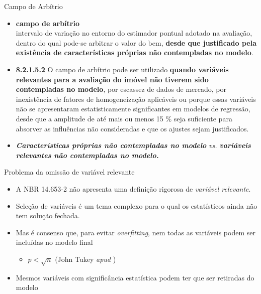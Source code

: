 \documentclass[9pt,ignorenonframetext,aspectratio=169]{beamer}
\providecommand{\tightlist}{%
  \setlength{\itemsep}{0pt}\setlength{\parskip}{0pt}}
\begin{document}
\begin{frame}{Campo de Arbítrio}
\protect\hypertarget{campo-de-arbuxedtrio}{}

\begin{itemize}[<+->]
\tightlist
\item
  \textbf{campo de arbítrio}\\
  intervalo de variação no entorno do estimador pontual adotado na
  avaliação, dentro do qual pode-se arbitrar o valor do bem,
  \textbf{desde que justificado 
  pela existência de características próprias não contempladas no modelo}.
  \autocite[3, grifo nosso]{NBR1465301}
\end{itemize}

\begin{itemize}[<+->]
\tightlist
\item
  \textbf{8.2.1.5.2} O campo de arbítrio pode ser utilizado
  \textbf{quando variáveis 
  relevantes para a avaliação do imóvel não tiverem sido contempladas no modelo},
  por escassez de dados de mercado, por inexistência de fatores de
  homogeneização aplicáveis ou porque essas variáveis não se
  apresentaram estatisticamente significantes em modelos de regressão,
  desde que a amplitude de até mais ou menos 15 \% seja suficiente para
  absorver as influências não consideradas e que os ajustes sejam
  justificados.\\
  \autocite[17, grifo nosso]{NBR1465302}
\end{itemize}

\begin{itemize}[<+->]
\tightlist
\item
  \emph{\textbf{Características próprias não contempladas no modelo}}
  \emph{vs.}
  \emph{\textbf{variáveis relevantes não contempladas no modelo.}}
\end{itemize}

\end{frame}

\begin{frame}{Problema da omissão de variável relevante}
\protect\hypertarget{problema-da-omissuxe3o-de-variuxe1vel-relevante}{}

\begin{itemize}[<+->]
\tightlist
\item
  A NBR 14.653-2 não apresenta uma definição rigorosa de \emph{variável 
  relevante}.
\item
  Seleção de variáveis é um tema complexo para o qual os estatísticos
  ainda não tem solução fechada.
\item
  Mas é consenso que, para evitar \emph{overfitting}, nem todas as
  variáveis podem ser incluídas no modelo final

  \begin{itemize}[<+->]
  \tightlist
  \item
    \(p < \sqrt{n}\) (John Tukey \emph{apud} \textcite{matloff2017})
  \end{itemize}
\item
  Mesmos variáveis com significância estatística podem ter que ser
  retiradas do modelo
\end{itemize}

\end{frame}
\end{document}

